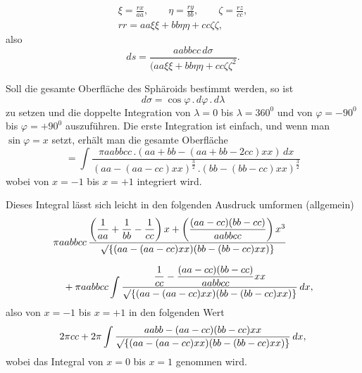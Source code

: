 %
\[
\begin{gathered}
\xi=\frac{rx}{aa},\qquad\eta=\frac{ry}{bb},\qquad\zeta=\frac{rz}{cc},\\[4pt]
rr=aa\xi\xi+bb\eta\eta+cc\zeta\zeta,
\end{gathered}
\]
also
\[
ds=\frac{aabbcc\,d\sigma}{{(aa\xi\xi+bb\eta\eta+cc\zeta\zeta}^{2}}.
\]

Soll die gesamte Oberfläche des Sphäroids bestimmt werden, so ist
\[
d\sigma=\cos\varphi\,.\,d\varphi\,.\,d\lambda
\]
zu setzen und die doppelte Integration von $\lambda=0$ bis $\lambda=360^0$ und von $\varphi=-90^0$ bis $\varphi=+90^0$ auszuführen. Die erste Integration ist einfach, und wenn man $\sin\varphi=x$ setzt, erhält man die gesamte Oberfläche
\[
=\int\frac{\pi aabbcc\,.(aa+bb-(aa+bb-2cc)xx)\,dx}{(aa-(aa-cc)xx)^{\frac32}\,.(bb-(bb-cc)xx)^{\frac32}}
\]
wobei von $x=-1$ bis $x=+1$ integriert wird.

Dieses Integral lässt sich leicht in den folgenden Ausdruck umformen (allgemein)
\[
\begin{aligned}
&\pi aabbcc\,\frac{\left(\dfrac1{aa}+\dfrac1{bb}-\dfrac1{cc}\right)x+\left(\dfrac{(aa-cc)(bb-cc)}{aabbcc}\right)x^3}{\mathord{\surd}\{(aa-(aa-cc)xx)(bb-(bb-cc)xx)\}}\\[7pt]
&\quad+\pi aabbcc\int\frac{\dfrac1{cc}-\dfrac{(aa-cc)(bb-cc)}{aabbcc}xx}{\mathord{\surd}\{(aa-(aa-cc)xx)(bb-(bb-cc)xx)\}}\,dx,
\end{aligned}
\]
also von $x=-1$ bis $x=+1$ in den folgenden Wert
\[
2\pi cc+2\pi\int\frac{aabb-(aa-cc)(bb-cc)xx}{\mathord{\surd}\{(aa-(aa-cc)xx)(bb-(bb-cc)xx)\}}\,dx,
\]
wobei das Integral von $x=0$ bis $x=1$ genommen wird.
